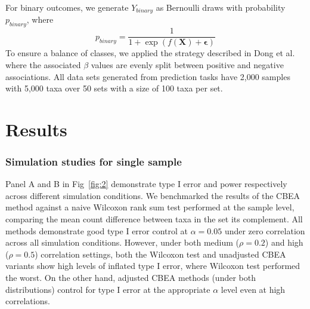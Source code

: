 For binary outcomes, we generate $Y_{binary}$ as Bernoulli draws with probability $p_{binary}$, where 
\begin{equation}
    p_{binary} = \frac{1}{1 + \exp(f(\mathbf{X}) + \mathbf{\epsilon})}
\end{equation}
To ensure a balance of classes, we applied the strategy described in Dong et al. \cite{dong2020} where the associated $\beta$ values are evenly split between positive and negative associations. All data sets generated from prediction tasks have 2,000 samples with 5,000 taxa over 50 sets with a size of 100 taxa per set.


\section{Results}
\subsubsection*{Simulation studies for single sample}
Panel A and B in Fig~\ref{fig:2} demonstrate type I error and power respectively across different simulation conditions. We benchmarked the results of the CBEA method against a naive Wilcoxon rank sum test performed at the sample level, comparing the mean count difference between taxa in the set its complement. All methods demonstrate good type I error control at $\alpha = 0.05$ under zero correlation across all simulation conditions. However, under both medium ($\rho = 0.2$) and high ($\rho = 0.5$) correlation settings, both the Wilcoxon test and unadjusted CBEA variants show high levels of inflated type I error, where Wilcoxon test performed the worst. On the other hand, adjusted CBEA methods (under both distributions) control for type I error at the appropriate $\alpha$ level even at high correlations. 

